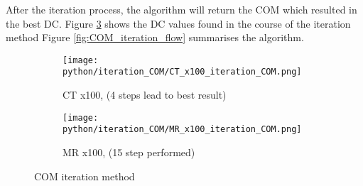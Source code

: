 After the iteration process, the algorithm will return the COM which resulted in the best DC.
Figure \ref{fig:COM_iteration} shows the DC values found in the course of the iteration method
Figure \ref{fig:COM_iteration_flow} summarises the algorithm.

\clearpage

\begin{figure}[!thb]
  \begin{subfigure}[b]{1\textwidth}
    \texttt{[image: python/iteration\_COM/CT\_x100\_iteration\_COM.png]}
    \caption{CT x100, (4 steps lead to best result)}
    \label{fig:CT_x100_iteration}
  \end{subfigure}
  \begin{subfigure}[b]{1\textwidth}
    \texttt{[image: python/iteration\_COM/MR\_x100\_iteration\_COM.png]}
     \caption{MR x100, (15 step performed)}
     \label{fig:MR_x100_iteration}
  \end{subfigure}
  \caption{COM iteration method}
  \label{fig:COM_iteration}
\end{figure}

